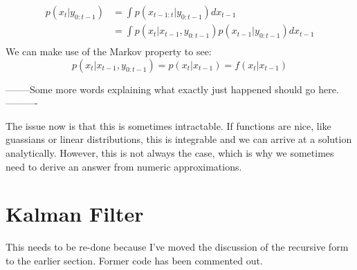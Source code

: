 \documentclass{article}
\begin{document}
\begin{equation}
\begin{split}
p(x_t|y_{0:t-1}) &= \int p(x_{t-1:t}|y_{0:t-1}) dx_{t-1}\\
&= \int p(x_t|x_{t-1},y_{0:t-1})p(x_{t-1}|y_{0:t-1}) dx_{t-1}\\
\end{split}
\end{equation}
We can make use of the Markov property to see:
\begin{equation}
p(x_t|x_{t-1},y_{0:t-1}) = p(x_t|x_{t-1}) = f(x_t|x_{t-1})
\end{equation}



--------Some more words explaining what exactly just happened should go here.----------

The issue now is that this is sometimes intractable. If functions are nice, like guassians or linear distributions, this is integrable and we can arrive at a solution analytically. However, this is not always the case, which is why we sometimes need to derive an answer from numeric approximations.

\section{Kalman Filter}

This needs to be re-done because I've moved the discussion of the recursive form to the earlier section. Former code has been commented out.



\end{document}
